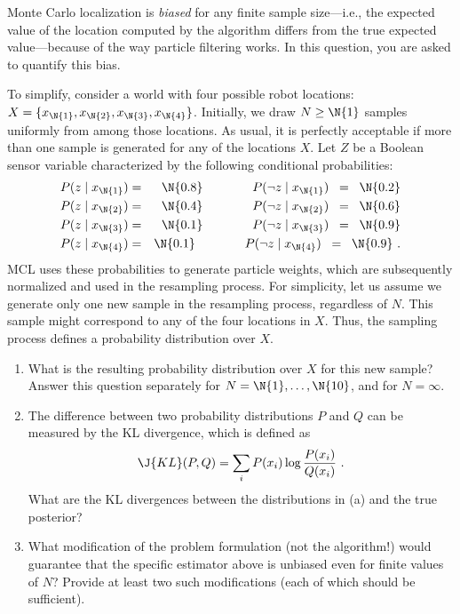 
\begin{exercise}%
Monte Carlo localization is {\em biased} for any finite sample size---i.e., the
expected value of the location computed by the algorithm differs from the true expected value---because of the way 
particle filtering works. In this question, you are asked to quantify this bias.

To simplify, consider a world with four possible robot
locations: \(X=\{x_\N{1},x_\N{2},x_\N{3},x_\N{4}\}\). Initially, we draw \(N\geq \N{1}\)
samples uniformly from among those locations. As usual, it is
perfectly acceptable if more than one sample is generated for any of
the locations \(X\).  Let \(Z\) be a Boolean sensor variable
characterized by the following conditional probabilities:
\begin{eqnarray*}
P(z\mid x_\N{1}) &=& \N{{0.8}} \qquad\qquad P(\lnot z\mid x_\N{1})\;\;=\;\;\N{{0.2}} \\
P(z\mid x_\N{2}) &=& \N{{0.4}} \qquad\qquad P(\lnot z\mid x_\N{2})\;\;=\;\;\N{{0.6}} \\
P(z\mid x_\N{3}) &=& \N{{0.1}} \qquad\qquad P(\lnot z\mid x_\N{3})\;\;=\;\;\N{{0.9}} \\
P(z\mid x_\N{4}) &=& \N{{0.1}} \qquad\qquad P(\lnot z\mid x_\N{4})\;\;=\;\;\N{{0.9}}\ .
\end{eqnarray*}
MCL uses these probabilities to generate particle weights, which are
subsequently normalized and used in the resampling process. For
simplicity, let us assume we generate only one new sample in the
resampling process, regardless of \(N\).  This sample might correspond
to any of the four locations in \(X\).  Thus, the sampling process
defines a probability distribution over \(X\).

\begin{enumerate}
\item  What is the resulting probability distribution
over \(X\) for this new sample? Answer this question separately for
\(N=\N{1},\ldots,\N{{10}}\), and for \(N=\infty\).  

\item The difference between two probability distributions \(P\) and \(Q\)
can be measured by the KL divergence, which is defined as
\[
  \J{KL}(P,Q) = \sum_i P(x_i)\log\frac{P(x_i)}{Q(x_i)}\ .
\]
What are the KL divergences between the distributions in (a)
and the true posterior?

\item
What modification of the problem formulation (not the algorithm!)
would guarantee that the specific estimator above is unbiased even for
finite values of \(N\)?  Provide at least two such modifications (each
of which should be sufficient).
\end{enumerate}
\end{exercise} 


